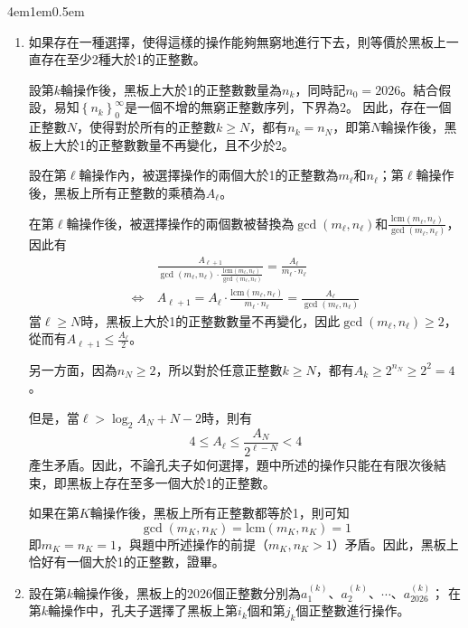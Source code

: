 \documentclass[12pt]{article}
\begin{document}
\begin{mybox}[解答]{4em}{1em}{0.5em}
    \begin{enumerate}[label=(\arabic*)]
        \item 如果存在一種選擇，使得這樣的操作能夠無窮地進行下去，則等價於黑板上一直存在至少2種大於1的正整數。
        
        設第$k$輪操作後，黑板上大於1的正整數數量為$n_k$，同時記$n_0=2026$。結合假設，易知$\left\{n_k\right\}_{0}^{\infty}$是一個不增的無窮正整數序列，下界為2。
        因此，存在一個正整數$N$，使得對於所有的正整數$k\geq N$，都有$n_k=n_N$，即第$N$輪操作後，黑板上大於1的正整數數量不再變化，且不少於2。

        設在第$\ell$輪操作內，被選擇操作的兩個大於1的正整數為$m_{\ell}$和$n_{\ell}$；第$\ell$輪操作後，黑板上所有正整數的乘積為$A_{\ell}$。

        在第$\ell$輪操作後，被選擇操作的兩個數被替換為$\gcd\left(m_{\ell},n_{\ell}\right)$和$\frac{\text{lcm}\left(m_{\ell},n_{\ell}\right)}{\gcd\left(m_{\ell},n_{\ell}\right)}$，因此有
        \begin{align*}
            &\frac{A_{\ell+1}}{\gcd\left(m_{\ell},n_{\ell}\right)\cdot\frac{\text{lcm}\left(m_{\ell},n_{\ell}\right)}{\gcd\left(m_{\ell},n_{\ell}\right)}}=\frac{A_{\ell}}{m_{\ell}\cdot n_{\ell}}\\
            \Leftrightarrow\ &A_{\ell+1}=A_{\ell}\cdot\frac{\text{lcm}\left(m_{\ell},n_{\ell}\right)}{m_{\ell}\cdot n_{\ell}}=\frac{A_{\ell}}{\gcd\left(m_{\ell},n_{\ell}\right)}
        \end{align*}
        當$\ell\geq N$時，黑板上大於1的正整數數量不再變化，因此$\gcd\left(m_{\ell},n_{\ell}\right)\geq 2$，從而有$A_{\ell+1}\leq \frac{A_{\ell}}{2}$。

        另一方面，因為$n_N\geq 2$，所以對於任意正整數$k\geq N$，都有$A_k\geq 2^{n_N}\geq 2^2=4$。

        但是，當$\ell>\log_{2}{A_N}+N-2$時，則有
        $$
            4\leq A_{\ell}\leq\frac{A_N}{2^{\ell-N}}<4
        $$
        產生矛盾。因此，不論孔夫子如何選擇，題中所述的操作只能在有限次後結束，即黑板上存在至多一個大於1的正整數。

        如果在第$K$輪操作後，黑板上所有正整數都等於1，則可知
        $$
            \gcd\left(m_K,n_K\right)=\text{lcm}\left(m_K,n_K\right)=1
        $$
        即$m_K=n_K=1$，與題中所述操作的前提（$m_K,n_K>1$）矛盾。因此，黑板上恰好有一個大於1的正整數，證畢。


        \item 設在第$k$輪操作後，黑板上的2026個正整數分別為$a_1^{\left(k\right)}$、$a_2^{\left(k\right)}$、$\cdots$、$a_{2026}^{\left(k\right)}$；
        在第$k$輪操作中，孔夫子選擇了黑板上第$i_k$個和第$j_k$個正整數進行操作。
        

\end{enumerate}
\end{mybox}
\end{document}
